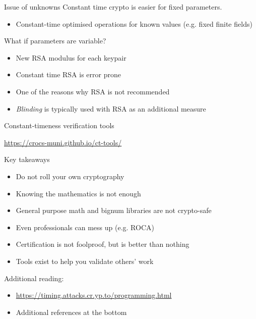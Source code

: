 \begin{frame}{Issue of unknowns}
  Constant time crypto is easier for fixed parameters.
  \begin{itemize}[<+(1)->]
    \item Constant-time optimised operations for known values (e.g. fixed finite fields)
  \end{itemize}

  \vspace*{1em}

  \pause
  What if parameters are variable?
  \begin{itemize}[<+(1)->]
    \item New RSA modulus for each keypair
    \item Constant time RSA is error prone
    \item One of the reasons why RSA is not recommended
    \item \emph{Blinding} is typically used with RSA as an additional measure
  \end{itemize}
\end{frame}

\begin{frame}{Constant-timeness verification tools}
  \begin{center}
    \url{https://crocs-muni.github.io/ct-tools/}
  \end{center}
\end{frame}

\begin{frame}{Key takeaways}
  \begin{itemize}[<+(1)->]
    \item Do not roll your own cryptography
    \item Knowing the mathematics is not enough
    \item General purpose math and bignum libraries are not crypto-safe
    \item Even professionals can mess up (e.g. ROCA)
    \item Certification is not foolproof, but is better than nothing
    \item Tools exist to help you validate others' work
  \end{itemize}

  \vspace*{1em}

  \pause
  Additional reading:
  \begin{itemize}
    \item \url{https://timing.attacks.cr.yp.to/programming.html}
    \item Additional references at the bottom
  \end{itemize}
\end{frame}


